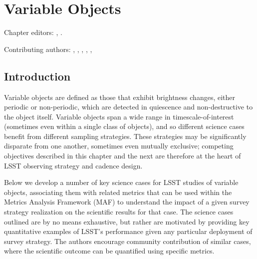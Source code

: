 
\chapter[Variable Objects]{Variable Objects}
\def\chpname{variables}\label{chp:\chpname}

Chapter editors:
,
.

Contributing authors:
,
,
,
,
,



\section{Introduction}

Variable objects are defined as those that exhibit brightness changes,
either periodic or non-periodic, which are detected in quiescence and
non-destructive to the object itself. Variable objects span a wide range
in timescale-of-interest (sometimes even within a single class of
objects), and so different science cases benefit from different sampling
strategies. These strategies may be significantly disparate from one
another, sometimes even mutually exclusive; competing objectives
described in this chapter and the next are therefore at the heart of
LSST observing strategy and cadence design.

Below we develop a number of key science cases for LSST studies of
variable objects, associating them with related metrics that can be used
within the Metrics Analysis Framework (MAF) to understand the impact of
a given survey strategy realization on the scientific results for that
case. The science cases outlined are by no means exhaustive, but rather
are motivated by providing key quantitative examples of LSST's
performance given any particular deployment of survey strategy. The
authors encourage community contribution of similar cases, where the
scientific outcome can be quantified using specific metrics.




